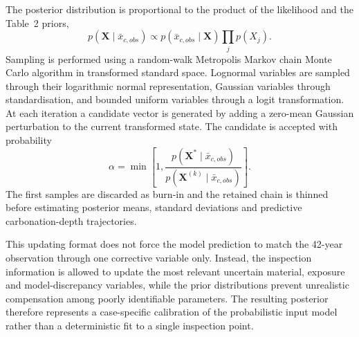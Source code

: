 The posterior distribution is proportional to the product of the likelihood and the Table~2 priors,
\begin{equation}
    p(\boldsymbol{X}\mid\bar{x}_{c,obs}) \propto
    p(\bar{x}_{c,obs}\mid\boldsymbol{X})\prod_j p(X_j).
\end{equation}
Sampling is performed using a random-walk Metropolis Markov chain Monte Carlo algorithm in transformed standard space. Lognormal variables are sampled through their logarithmic normal representation, Gaussian variables through standardisation, and bounded uniform variables through a logit transformation. At each iteration a candidate vector is generated by adding a zero-mean Gaussian perturbation to the current transformed state. The candidate is accepted with probability
\begin{equation}
    \alpha = \min\left[1,\frac{p(\boldsymbol{X}^{*}\mid\bar{x}_{c,obs})}{p(\boldsymbol{X}^{(k)}\mid\bar{x}_{c,obs})}\right].
\end{equation}
The first samples are discarded as burn-in and the retained chain is thinned before estimating posterior means, standard deviations and predictive carbonation-depth trajectories.

This updating format does not force the model prediction to match the 42-year observation through one corrective variable only. Instead, the inspection information is allowed to update the most relevant uncertain material, exposure and model-discrepancy variables, while the prior distributions prevent unrealistic compensation among poorly identifiable parameters. The resulting posterior therefore represents a case-specific calibration of the probabilistic input model rather than a deterministic fit to a single inspection point.
